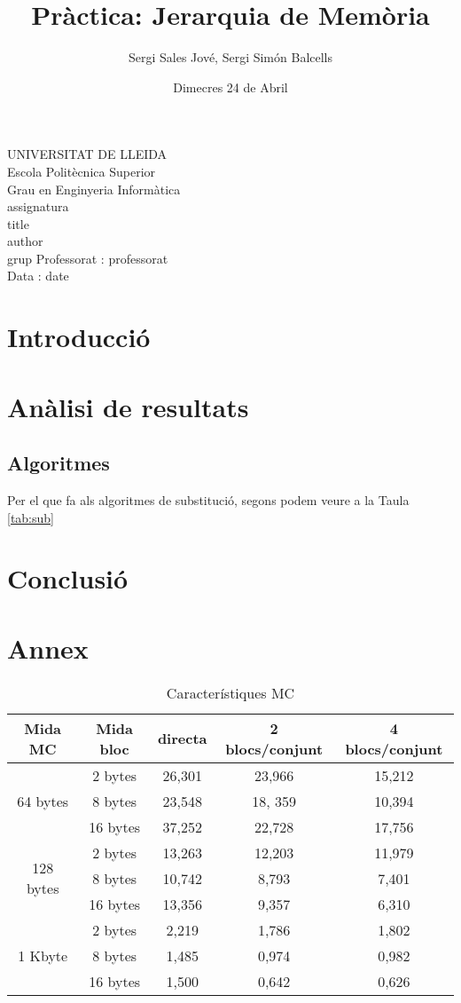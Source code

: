 \documentclass{article}
\title{Pràctica: Jerarquia de Memòria}
\author{Sergi Sales Jové, Sergi Simón Balcells}
\date{Dimecres 24 de Abril}
\renewcommand{\maketitle}{ %
    \begin{titlepage}
        \raggedright{UNIVERSITAT DE LLEIDA \\
            Escola Politècnica Superior \\
            Grau en Enginyeria Informàtica\\
            \1assignatura\\}
            \vspace{5cm}
            \centering\huge{\5title \\}
            \vspace{3cm}
            \large{\6author} \\
            \normalsize{\3grup}
            \vfill
            Professorat : \4professorat \\
            Data : \7date
\end{titlepage}}
\begin{document}
\maketitle
\thispagestyle{empty}

\newpage
{}
\tableofcontents
\newpage
{}
\section{Introducció}
\section{Anàlisi de resultats}
\subsection{Algoritmes}
Per el que fa als algoritmes de substitució, segons podem veure a la Taula \ref{tab:sub}
\section{Conclusió}
\section{Annex}

\begin{table}[!h]
\begin{tabular}{ |c|c|c|c|c| }
\hline
Mida MC& Mida bloc& directa& 2 blocs/conjunt& 4 blocs/conjunt \\
\hline
\multirow{3}{4em}{64 bytes} & 2 bytes & 26,301 & 23,966 & 15,212 \\
& 8 bytes & 23,548 & 18, 359 & 10,394 \\
& 16 bytes & 37,252 & 22,728 & 17,756 \\
\hline
\multirow{3}{4em}{128 bytes} & 2 bytes & 13,263 & 12,203 & 11,979 \\
& 8 bytes & 10,742 & 8,793 & 7,401 \\
& 16 bytes & 13,356 & 9,357 & 6,310 \\
\hline
\multirow{3}{4em}{1 Kbyte} & 2 bytes & 2,219 & 1,786 & 1,802 \\
& 8 bytes & 1,485 & 0,974 & 0,982 \\
& 16 bytes & 1,500 & 0,642 & 0,626 \\
\hline

\end{tabular}
\caption{Característiques MC}
\label{tab:mc}
\end{table}
\end{document}
